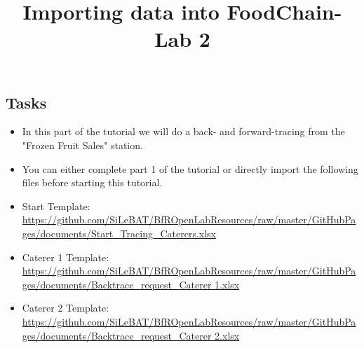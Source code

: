 \documentclass{beamer}
\title{Importing data into FoodChain-Lab 2}
\date{}
\begin{document}
\maketitle

\section{ }

\subsection{Tasks}
\begin{frame}
	\begin{itemize}
		\item In this part of the tutorial we will do a back- and forward-tracing from the "Frozen Fruit Sales" station.
		\item You can either complete part 1 of the tutorial or directly import the following files before starting this tutorial.
		\item Start Template: \url{https://github.com/SiLeBAT/BfROpenLabResources/raw/master/GitHubPages/documents/Start_Tracing_Caterers.xlsx}
		\item Caterer 1 Template: \url{https://github.com/SiLeBAT/BfROpenLabResources/raw/master/GitHubPages/documents/Backtrace_request_Caterer 1.xlsx}
		\item Caterer 2 Template: \url{https://github.com/SiLeBAT/BfROpenLabResources/raw/master/GitHubPages/documents/Backtrace_request_Caterer 2.xlsx}
	\end{itemize}
\end{frame}
 
\end{document}
